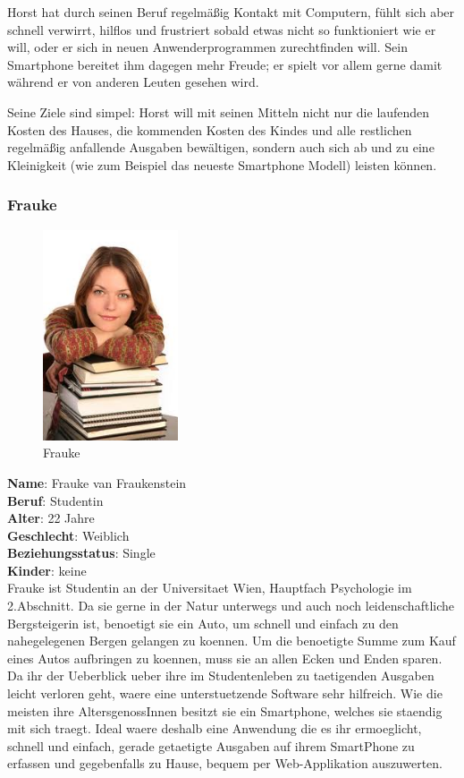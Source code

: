 Horst hat durch seinen Beruf regelm\"a\ss ig Kontakt mit Computern, f\"uhlt sich aber schnell verwirrt, hilflos und
frustriert sobald etwas nicht so funktioniert wie er will, oder er sich in neuen Anwenderprogrammen zurechtfinden will.
Sein Smartphone bereitet ihm dagegen mehr Freude; er spielt vor allem gerne damit w\"ahrend
er von anderen Leuten gesehen wird.

Seine Ziele sind simpel: Horst will mit seinen Mitteln nicht nur die laufenden Kosten des Hauses,
die kommenden Kosten des Kindes und alle restlichen regelm\"a\ss ig anfallende Ausgaben bew\"altigen,
sondern auch sich ab und zu eine Kleinigkeit (wie zum Beispiel das neueste Smartphone Modell) leisten k\"onnen.

\newpage
\subsubsection{Frauke}

\begin{figure}
\centering
\includegraphics[width=4cm]{img/frauke}
\caption{Frauke}
\label{fig:frauke}
\end{figure}

\textbf{Name}: Frauke van Fraukenstein \\
\textbf{Beruf}: Studentin \\
\textbf{Alter}: 22 Jahre \\
\textbf{Geschlecht}: Weiblich \\
\textbf{Beziehungsstatus}: Single \\
\textbf{Kinder}: keine \\

Frauke ist Studentin an der Universitaet Wien, Hauptfach Psychologie im 2.Abschnitt.
Da sie gerne in der Natur unterwegs und auch noch leidenschaftliche Bergsteigerin ist,
benoetigt sie ein Auto, um schnell und einfach zu den nahegelegenen Bergen gelangen
zu koennen. Um die benoetigte Summe zum Kauf eines Autos aufbringen zu koennen, muss
sie an allen Ecken und Enden sparen. Da ihr der Ueberblick ueber ihre im Studentenleben
zu taetigenden Ausgaben leicht verloren geht, waere eine unterstuetzende Software sehr
hilfreich. Wie die meisten ihre AltersgenossInnen besitzt sie ein Smartphone, welches
sie staendig mit sich traegt. Ideal waere deshalb eine Anwendung die es ihr ermoeglicht,
schnell und einfach, gerade getaetigte Ausgaben auf ihrem SmartPhone zu erfassen und
gegebenfalls zu Hause, bequem per Web-Applikation auszuwerten.

